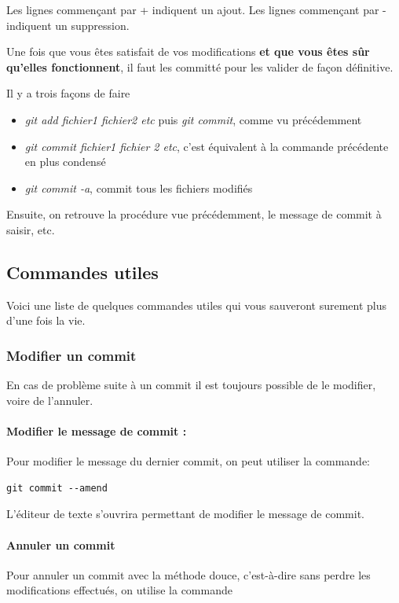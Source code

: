 \documentclass[a4paper]{article}
\begin{document}
Les lignes commençant par + indiquent un ajout. Les lignes commençant par - indiquent un suppression.

Une fois que vous êtes satisfait de vos modifications \textbf{et que vous êtes sûr qu'elles fonctionnent}, il faut les committé pour les valider de façon définitive.

Il y a trois façons de faire

\begin{itemize}
\item \emph{git add fichier1 fichier2 etc} puis \emph{git commit}, comme vu précédemment 
\item \emph{git commit fichier1 fichier 2 etc}, c'est équivalent à la commande précédente en plus condensé
\item \emph{git commit -a}, commit tous les fichiers modifiés
\end{itemize}

Ensuite, on retrouve la procédure vue précédemment, le message de commit à saisir, etc.

\subsection{Commandes utiles}

Voici une liste de quelques commandes utiles qui vous sauveront surement plus d'une fois la vie.

\subsubsection{Modifier un commit}

En cas de problème suite à un commit il est toujours possible de le modifier, voire de l'annuler.

\paragraph{Modifier le message de commit :}Pour modifier le message du dernier commit, on peut utiliser la commande:
\begin{verbatim}
git commit --amend
\end{verbatim}
L'éditeur de texte s'ouvrira permettant de modifier le message de commit.

\paragraph{Annuler un commit}Pour annuler un commit avec la méthode douce, c'est-à-dire sans perdre les modifications effectués, on utilise la commande
\end{document}
